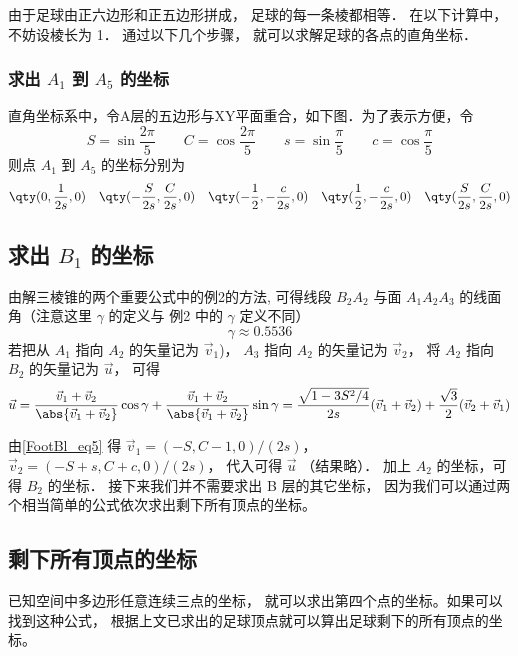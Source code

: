 由于足球由正六边形和正五边形拼成， 足球的每一条棱都相等． 在以下计算中， 不妨设棱长为 1． 通过以下几个步骤， 就可以求解足球的各点的直角坐标．

\subsubsection{求出 $A_1$ 到 $A_5$ 的坐标}
直角坐标系中，令A层的五边形与XY平面重合，如下图．为了表示方便，令
\begin{equation}
S = \sin\frac{2\pi}{5} \qquad
C = \cos\frac{2\pi}{5} \qquad
s = \sin\frac{\pi}{5} \qquad
c = \cos\frac{\pi}{5}
\end{equation}
则点 $A_1$ 到 $A_5$ 的坐标分别为
\begin{equation}\label{FootBl_eq5}
\qty(0, \frac{1}{2s}, 0) \quad
\qty(-\frac{S}{2s}, \frac{C}{2s}, 0) \quad
\qty(-\frac12, -\frac{c}{2s}, 0) \quad
\qty(\frac12, -\frac{c}{2s}, 0) \quad
\qty(\frac{S}{2s}, \frac{C}{2s}, 0)
\end{equation}

\subsection{求出 $B_1$ 的坐标}
由解三棱锥的两个重要公式中的例2的方法, 可得线段 $B_2 A_2$ 与面 $A_1A_2A_3$ 的线面角（注意这里 $\gamma$ 的定义与 例2 中的 $\gamma$ 定义不同）
\begin{equation}
\gamma \approx 0.5536
\end{equation}
若把从 $A_1$ 指向 $A_2$ 的矢量记为 $\vec v_1$)， $A_3$ 指向 $A_2$ 的矢量记为 $\vec v_2$， 将 $A_2$ 指向 $B_2$ 的矢量记为 $\vec u$， 可得
\begin{equation}
\vec u = \frac{\vec v_1 + \vec v_2}{\abs{\vec v_1 + \vec v_2}} \cos\gamma
+ \frac{\vec v_1 + \vec v_2}{\abs{\vec v_1 + \vec v_2}} \sin\gamma
= \frac{\sqrt{1 - 3S^2/4}}{2s} (\vec v_1 + \vec v_2) + \frac{\sqrt{3}}{2} (\vec v_2 + \vec v_1)
\end{equation}

由\autoref{FootBl_eq5} 得 $\vec v_1 = (-S, C-1, 0)/(2s)$， $\vec v_2 = (-S+s, C+c, 0)/(2s)$， 代入可得 $\vec u$ （结果略）． 加上 $A_2$ 的坐标，可得 $B_2$ 的坐标． 接下来我们并不需要求出 B 层的其它坐标， 因为我们可以通过两个相当简单的公式依次求出剩下所有顶点的坐标。

\subsection{剩下所有顶点的坐标}
已知空间中多边形任意连续三点的坐标， 就可以求出第四个点的坐标。如果可以找到这种公式， 根据上文已求出的足球顶点就可以算出足球剩下的所有顶点的坐标。

